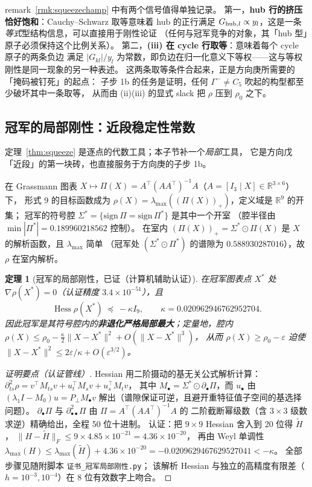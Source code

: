 \documentclass[UTF8,11pt]{ctexart}
\newtheorem{theorem}{定理}[section]
\theoremstyle{definition}
\newcommand{\R}{\mathbb{R}}
\begin{document}
remark~\ref{rmk:squeezechamp} 中有两个信号值得单独记录。
第一，\textbf{hub 行的挤压恰好饱和}：Cauchy--Schwarz 取等意味着 hub 的正行满足
$G_{{\rm hub},l}\propto y_l$，这是一条\emph{等式}型结构信息，可以直接用于刚性论证
（任何与冠军竞争的对象，其「hub 型」原子必须保持这个比例关系）。
第二，\textbf{(iii) 在 cycle 行取等}：意味着每个 cycle 原子的两条负边
满足 $|G_{kl}|/y_l$ 为常数，即负边在归一化意义下等权——这与等权刚性是同一现象的另一种表述。
这两条取等条件合起来，正是方向庚所需要的「掩码被钉死」的起点：
子步 1b 的任务是证明，任何 $\Gamma^-\ne C_5$ 吹起的构型都至少破坏其中一条取等，
从而由 (ii)(iii) 的显式 slack 把 $\rho$ 压到 $\rho_0$ 之下。

\subsection{冠军的局部刚性：近段稳定性常数}\label{sec:locrig}

定理~\ref{thm:squeeze} 是逐点的代数工具；本子节补一个\emph{局部}工具，
它是方向戊「近段」的第一块砖，也直接服务于方向庚的子步 1b。

在 Grassmann 图表 $X\mapsto\Pi(X)=A^\top(AA^\top)^{-1}A$（$A=[I_3\mid X]\in\R^{3\times6}$）下，
形式 9 的目标函数成为 $\rho(X)=\lambda_{\max}((\Pi(X))_+)$，定义域是 $\R^9$ 的开集；
冠军的符号腔 $\Sigma^*=\{\text{sign}\,\Pi=\text{sign}\,\Pi^*\}$ 是其中一个开室
（腔半径由 $\min|\Pi^*|=0.189960218562$ 控制）。
在室内 $(\Pi(X))_+=\Sigma^*\odot\Pi(X)$ 是 $X$ 的解析函数，且 $\lambda_{\max}$ 简单
（冠军处 $(\Sigma^*\odot\Pi^*)$ 的谱隙为 $0.588930287016$），故 $\rho$ 在室内解析。

\begin{theorem}[冠军的局部刚性，已证（计算机辅助认证）]\label{thm:locrig}
在冠军图表点 $X^*$ 处 $\nabla\rho(X^*)=0$（认证精度 $3.4\times10^{-51}$），且
\[
\operatorname{Hess}\rho(X^*)\ \preceq\ -\kappa I_9,\qquad
\kappa=0.020962946762952704 .
\]
因此冠军是其符号腔内的\textbf{非退化严格局部最大}；定量地，腔内
$\rho(X)\le\rho_0-\frac\kappa2\|X-X^*\|^2+O(\|X-X^*\|^3)$，
从而 $\rho(X)\ge\rho_0-\varepsilon$ 迫使 $\|X-X^*\|^2\le2\varepsilon/\kappa+O(\varepsilon^{3/2})$。
\end{theorem}

\begin{proof}[证明要点（认证管线）]
Hessian 用二阶摄动的基无关公式解析计算：
$\partial_{ts}^2\rho=v^\top M_{ts}v+u_t^\top M_sv+u_s^\top M_tv$，
其中 $M_\bullet=\Sigma^*\odot\partial_\bullet\Pi$，而 $u_\bullet$ 由
$(\lambda_1I-M_0)u=P_\perp M_\bullet v$ 解出（谱隙保证可逆，且避开重特征值子空间的基选择问题）。
$\partial_\bullet\Pi$ 与 $\partial^2_{\bullet\bullet}\Pi$ 由 $\Pi=A^\top(AA^\top)^{-1}A$ 的
二阶截断幂级数（含 $3\times3$ 级数求逆）精确给出，全程 50 位十进制。
认证：把 $9\times9$ Hessian 舍入到 20 位得 $\tilde H$，
$\|H-\tilde H\|_F\le9\times4.85\times10^{-21}=4.36\times10^{-20}$，
再由 Weyl 单调性 $\lambda_{\max}(H)\le\lambda_{\max}(\tilde H)+4.36\times10^{-20}
=-0.0209629467629527041<-\kappa$。
全部步骤见随附脚本 \texttt{证书\_冠军局部刚性.py}；
该解析 Hessian 与独立的高精度有限差（$h=10^{-3},10^{-4}$）在 8 位有效数字上吻合。
\end{proof}
\end{document}
